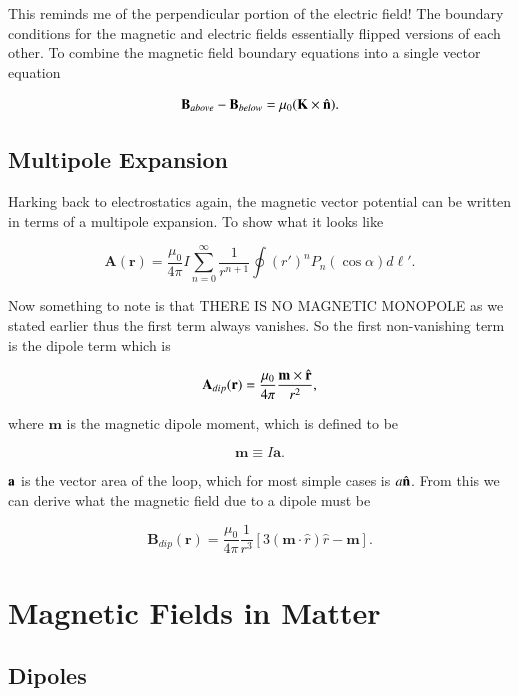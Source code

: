 \documentclass[preprint, review,12pt]{elsarticle}
\def\m{\frac{\mu_0}{4\pi}}
\def\x{\times}
\def\.{\cdot}
\def\b{\textbf}
\def\bell{\bm{\ell}}
\def\={\equiv}
\begin{document}
This reminds me of the perpendicular portion of the electric field! The boundary conditions for the magnetic and electric fields essentially flipped versions of each other. To combine the magnetic field boundary equations into a single vector equation

\begin{equation}
    \b{B}_{above} - \b{B}_{below}= \mu_0 (\b{K} \x \hat{\b n}).
\end{equation}

\subsection{Multipole Expansion}

Harking back to electrostatics again, the magnetic vector potential can be written in terms of a multipole expansion. To show what it looks like

\begin{equation}
    \b{A}(\b{r}) = \m I \sum_{n=0}^\infty \frac{1}{r^{n+1}}\oint (r')^n  P_n(\cos\alpha) d\bell '.
\end{equation}

Now something to note is that THERE IS NO MAGNETIC MONOPOLE as we stated earlier thus the first term always vanishes. So the first non-vanishing term is the dipole term which is

\begin{equation}
    \b{A}_{dip}(\b{r}) = \m \frac{\b{m} \x \hat{\b r}}{r^2},
\end{equation}

where $\b{m}$ is the magnetic dipole moment, which is defined to be

\begin{equation}
    \b{m} \= I\b{a}.
\end{equation}

$\b a$ is the vector area of the loop, which for most simple cases is $a\hat{\b n}$. From this we can derive what the magnetic field due to a dipole must be

\begin{equation}
    \b{B}_{dip}(\b{r}) = \m \frac{1}{r^3}[3(\b{m} \. \hat{r})\hat{r} - \b{m}].
\end{equation}

\section{Magnetic Fields in Matter}

\subsection{Dipoles}
\end{document}
